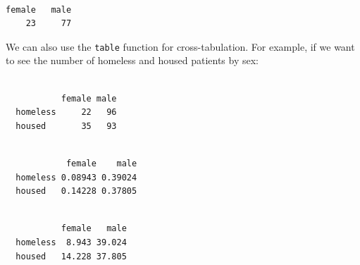 \documentclass[]{book}
\newenvironment{Shaded}{\begin{snugshade}}{\end{snugshade}}
\newcommand{\CommentTok}[1]{\textcolor[rgb]{0.56,0.35,0.01}{\textit{#1}}}
\newcommand{\DecValTok}[1]{\textcolor[rgb]{0.00,0.00,0.81}{#1}}
\newcommand{\KeywordTok}[1]{\textcolor[rgb]{0.13,0.29,0.53}{\textbf{#1}}}
\newcommand{\NormalTok}[1]{#1}
\newcommand{\OperatorTok}[1]{\textcolor[rgb]{0.81,0.36,0.00}{\textbf{#1}}}
\begin{document}
\begin{verbatim}

female   male 
    23     77 
\end{verbatim}

We can also use the \texttt{table} function for cross-tabulation. For example, if we want to see the number of homeless and housed patients by sex:

\begin{Shaded}
\end{Shaded}

\begin{verbatim}
          
           female male
  homeless     22   96
  housed       35   93
\end{verbatim}

\begin{Shaded}
\end{Shaded}

\begin{verbatim}
          
            female    male
  homeless 0.08943 0.39024
  housed   0.14228 0.37805
\end{verbatim}

\begin{Shaded}
\end{Shaded}

\begin{verbatim}
          
           female   male
  homeless  8.943 39.024
  housed   14.228 37.805
\end{verbatim}

\begin{Shaded}
\end{Shaded}
\end{document}
